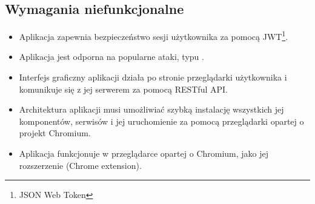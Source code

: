 \clearpage
\subsection{Wymagania niefunkcjonalne}

\begin{itemize}
    \item Aplikacja zapewnia bezpieczeństwo sesji użytkownika za pomocą JWT\footnote{JSON Web Token}.
    \item Aplikacja jest odporna na popularne ataki, typu .
    \item Interfejs graficzny aplikacji działa po stronie przeglądarki użytkownika i komunikuje się z jej serwerem za pomocą RESTful API.
    \item Architektura aplikacji musi umożliwiać szybką instalację wszystkich jej komponentów, serwisów i jej uruchomienie za pomocą przeglądarki opartej o projekt Chromium.
    \item Aplikacja funkcjonuje w przeglądarce opartej o Chromium, jako jej rozszerzenie (Chrome extension).
\end{itemize}
